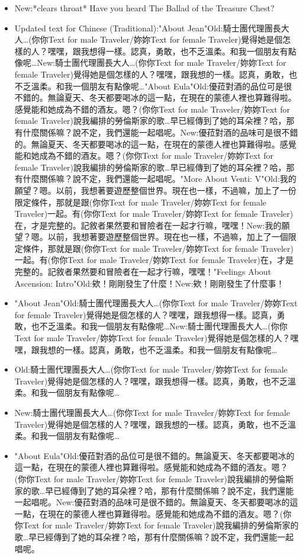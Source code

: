 \documentclass[a4paper,12pt]{article}
\begin{document}
\begin{itemize}
\item New:*clears throat* Have you heard The Ballad of the Treasure Chest?
\item Updated text for Chinese (Traditional):"About Jean"Old:騎士團代理團長大人…(‍你你Text for male Traveler/妳妳Text for female Traveler‍)覺得她是個怎樣的人？嘿嘿，跟我想得一樣。認真，勇敢，也不乏溫柔。和我一個朋友有點像呢…New:騎士團代理團長大人…(‍你你Text for male Traveler/妳妳Text for female Traveler‍)覺得她是個怎樣的人？嘿嘿，跟我想的一樣。認真，勇敢，也不乏溫柔。和我一個朋友有點像呢…"About Eula"Old:優菈對酒的品位可是很不錯的。無論夏天、冬天都要喝冰的這一點，在現在的蒙德人裡也算難得啦。感覺能和她成為不錯的酒友。嗯？(‍你你Text for male Traveler/妳妳Text for female Traveler‍)說我編排的勞倫斯家的歌…早已經傳到了她的耳朵裡？哈，那有什麼關係嘛？說不定，我們還能一起唱呢。New:優菈對酒的品味可是很不錯的。無論夏天、冬天都要喝冰的這一點，在現在的蒙德人裡也算難得啦。感覺能和她成為不錯的酒友。嗯？(‍你你Text for male Traveler/妳妳Text for female Traveler‍)說我編排的勞倫斯家的歌…早已經傳到了她的耳朵裡？哈，那有什麼關係嘛？說不定，我們還能一起唱呢。"More About Venti: V"Old:我的願望？嗯。以前，我想著要遊歷整個世界。現在也一樣，不過嘛，加上了一份限定條件，那就是跟(‍你你Text for male Traveler/妳妳Text for female Traveler‍)一起。有(‍你你Text for male Traveler/妳妳Text for female Traveler‍)在，才是完整的。記敘者果然要和冒險者在一起才行嘛，嘿嘿！New:我的願望？嗯。以前，我想著要遊歷整個世界。現在也一樣，不過嘛，加上了一個限定條件，那就是跟(‍你你Text for male Traveler/妳妳Text for female Traveler‍)一起。有(‍你你Text for male Traveler/妳妳Text for female Traveler‍)在，才是完整的。記敘者果然要和冒險者在一起才行嘛，嘿嘿！"Feelings About Ascension: Intro"Old:欸！剛剛發生了什麼！New:欸！剛剛發生了什麼事！
\item "About Jean"Old:騎士團代理團長大人…(‍你你Text for male Traveler/妳妳Text for female Traveler‍)覺得她是個怎樣的人？嘿嘿，跟我想得一樣。認真，勇敢，也不乏溫柔。和我一個朋友有點像呢…New:騎士團代理團長大人…(‍你你Text for male Traveler/妳妳Text for female Traveler‍)覺得她是個怎樣的人？嘿嘿，跟我想的一樣。認真，勇敢，也不乏溫柔。和我一個朋友有點像呢…
\item Old:騎士團代理團長大人…(‍你你Text for male Traveler/妳妳Text for female Traveler‍)覺得她是個怎樣的人？嘿嘿，跟我想得一樣。認真，勇敢，也不乏溫柔。和我一個朋友有點像呢…
\item New:騎士團代理團長大人…(‍你你Text for male Traveler/妳妳Text for female Traveler‍)覺得她是個怎樣的人？嘿嘿，跟我想的一樣。認真，勇敢，也不乏溫柔。和我一個朋友有點像呢…
\item "About Eula"Old:優菈對酒的品位可是很不錯的。無論夏天、冬天都要喝冰的這一點，在現在的蒙德人裡也算難得啦。感覺能和她成為不錯的酒友。嗯？(‍你你Text for male Traveler/妳妳Text for female Traveler‍)說我編排的勞倫斯家的歌…早已經傳到了她的耳朵裡？哈，那有什麼關係嘛？說不定，我們還能一起唱呢。New:優菈對酒的品味可是很不錯的。無論夏天、冬天都要喝冰的這一點，在現在的蒙德人裡也算難得啦。感覺能和她成為不錯的酒友。嗯？(‍你你Text for male Traveler/妳妳Text for female Traveler‍)說我編排的勞倫斯家的歌…早已經傳到了她的耳朵裡？哈，那有什麼關係嘛？說不定，我們還能一起唱呢。

\end{itemize}
\end{document}

